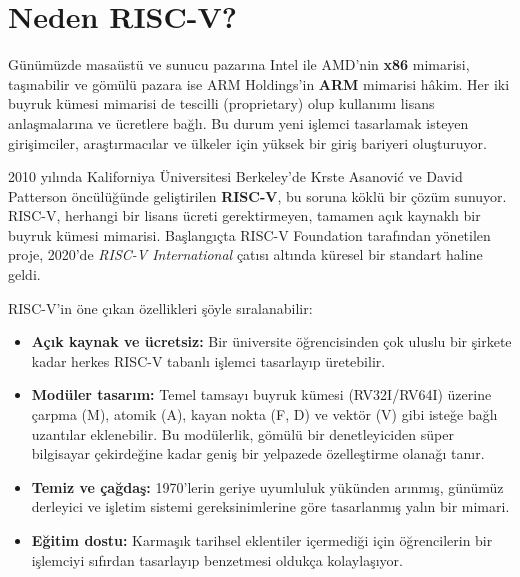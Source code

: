 \section{Neden RISC-V?}
\label{sec:neden-riscv}

Günümüzde masaüstü ve sunucu pazarına Intel ile AMD'nin \textbf{x86} mimarisi, taşınabilir ve gömülü pazara ise ARM Holdings'in \textbf{ARM} mimarisi hâkim. Her iki buyruk kümesi mimarisi de tescilli (proprietary) olup kullanımı lisans anlaşmalarına ve ücretlere bağlı. Bu durum yeni işlemci tasarlamak isteyen girişimciler, araştırmacılar ve ülkeler için yüksek bir giriş bariyeri oluşturuyor.

2010 yılında Kaliforniya Üniversitesi Berkeley'de Krste Asanovi\'{c} ve David Patterson öncülüğünde geliştirilen \textbf{RISC-V}, bu soruna köklü bir çözüm sunuyor. RISC-V, herhangi bir lisans ücreti gerektirmeyen, tamamen açık kaynaklı bir buyruk kümesi mimarisi. Başlangıçta RISC-V Foundation tarafından yönetilen proje, 2020'de \emph{RISC-V International} çatısı altında küresel bir standart haline geldi.

RISC-V'in öne çıkan özellikleri şöyle sıralanabilir:
\begin{itemize}
    \item \textbf{Açık kaynak ve ücretsiz:} Bir üniversite öğrencisinden çok uluslu bir şirkete kadar herkes RISC-V tabanlı işlemci tasarlayıp üretebilir.
    \item \textbf{Modüler tasarım:} Temel tamsayı buyruk kümesi (RV32I/RV64I) üzerine çarpma (M), atomik (A), kayan nokta (F, D) ve vektör (V) gibi isteğe bağlı uzantılar eklenebilir. Bu modülerlik, gömülü bir denetleyiciden süper bilgisayar çekirdeğine kadar geniş bir yelpazede özelleştirme olanağı tanır.
    \item \textbf{Temiz ve çağdaş:} 1970'lerin geriye uyumluluk yükünden arınmış, günümüz derleyici ve işletim sistemi gereksinimlerine göre tasarlanmış yalın bir mimari.
    \item \textbf{Eğitim dostu:} Karmaşık tarihsel eklentiler içermediği için öğrencilerin bir işlemciyi sıfırdan tasarlayıp benzetmesi oldukça kolaylaşıyor.
\end{itemize}

